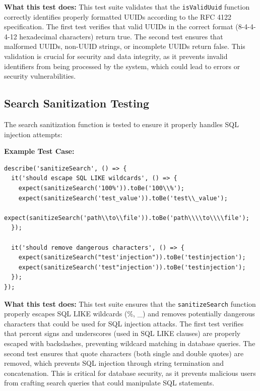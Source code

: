 \textbf{What this test does:} This test suite validates that the \texttt{isValidUuid} function correctly identifies properly formatted UUIDs according to the RFC 4122 specification. The first test verifies that valid UUIDs in the correct format (8-4-4-4-12 hexadecimal characters) return true. The second test ensures that malformed UUIDs, non-UUID strings, or incomplete UUIDs return false. This validation is crucial for security and data integrity, as it prevents invalid identifiers from being processed by the system, which could lead to errors or security vulnerabilities.

\subsection{Search Sanitization Testing}

The search sanitization function is tested to ensure it properly handles SQL injection attempts:

\textbf{Example Test Case:}
\begin{verbatim}
describe('sanitizeSearch', () => {
  it('should escape SQL LIKE wildcards', () => {
    expect(sanitizeSearch('100%')).toBe('100\\%');
    expect(sanitizeSearch('test_value')).toBe('test\\_value');
    expect(sanitizeSearch('path\\to\\file')).toBe('path\\\\to\\\\file');
  });

  it('should remove dangerous characters', () => {
    expect(sanitizeSearch("test'injection")).toBe('testinjection');
    expect(sanitizeSearch('test"injection')).toBe('testinjection');
  });
});
\end{verbatim}

\textbf{What this test does:} This test suite ensures that the \texttt{sanitizeSearch} function properly escapes SQL LIKE wildcards (\%, \_) and removes potentially dangerous characters that could be used for SQL injection attacks. The first test verifies that percent signs and underscores (used in SQL LIKE clauses) are properly escaped with backslashes, preventing wildcard matching in database queries. The second test ensures that quote characters (both single and double quotes) are removed, which prevents SQL injection through string termination and concatenation. This is critical for database security, as it prevents malicious users from crafting search queries that could manipulate SQL statements.

